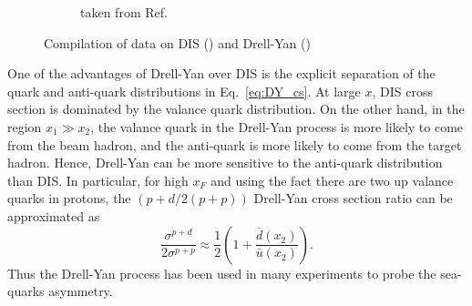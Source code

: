 \begin{figure}[htbp!]
\begin{subfigure}{0.45\linewidth}
		\caption{taken from Ref.\ \cite{mcgaughey1999}}
		\label{subfig:DY_scaling}
	\end{subfigure}
	\caption{Compilation of data on DIS () and 
		Drell-Yan ()}
	\label{fig:scaling}
\end{figure}
One of the advantages of Drell-Yan over DIS is the explicit separation of the quark
and anti-quark distributions in Eq.\ \ref{eq:DY_cs}. At large $x$, DIS cross section 
is dominated by the valance quark distribution. On the other hand, in the region $x_1 \gg x_2$,
the valance quark in the Drell-Yan process is more likely to come from the beam 
hadron, and the anti-quark is more likely to come from the target hadron. Hence,
Drell-Yan can be more sensitive to the anti-quark distribution than DIS. In 
particular, for high $x_F$ and using the fact there are two up valance quarks in 
protons, the $(p+d/2(p+p))$ Drell-Yan cross section ratio can be approximated as 
\begin{equation}
	\frac{\sigma^{p+d}}{2\sigma^{p+p}} \approx \frac{1}{2} \left( 1+ \frac{\bar{d}\left(x_2\right)}{\bar{u}\left(x_2\right)} \right).
\end{equation}
Thus the Drell-Yan process has been used in many experiments to probe the sea-quarks 
asymmetry.


